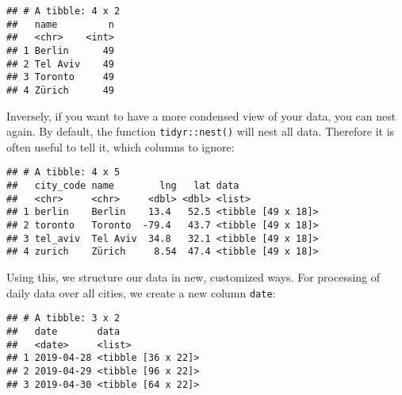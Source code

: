 \documentclass[]{book}
\newenvironment{Shaded}{\begin{snugshade}}{\end{snugshade}}
\newcommand{\DataTypeTok}[1]{\textcolor[rgb]{0.13,0.29,0.53}{#1}}
\newcommand{\KeywordTok}[1]{\textcolor[rgb]{0.13,0.29,0.53}{\textbf{#1}}}
\newcommand{\NormalTok}[1]{#1}
\newcommand{\OperatorTok}[1]{\textcolor[rgb]{0.81,0.36,0.00}{\textbf{#1}}}
\newcommand{\StringTok}[1]{\textcolor[rgb]{0.31,0.60,0.02}{#1}}
\begin{document}
\begin{verbatim}
## # A tibble: 4 x 2
##   name         n
##   <chr>    <int>
## 1 Berlin      49
## 2 Tel Aviv    49
## 3 Toronto     49
## 4 Zürich      49
\end{verbatim}

Inversely, if you want to have a more condensed view of your data, you can nest again.
By default, the function \texttt{tidyr::nest()} will nest all data.
Therefore it is often useful to tell it, which columns to ignore:

\begin{Shaded}
\end{Shaded}

\begin{verbatim}
## # A tibble: 4 x 5
##   city_code name        lng   lat data              
##   <chr>     <chr>     <dbl> <dbl> <list>            
## 1 berlin    Berlin    13.4   52.5 <tibble [49 x 18]>
## 2 toronto   Toronto  -79.4   43.7 <tibble [49 x 18]>
## 3 tel_aviv  Tel Aviv  34.8   32.1 <tibble [49 x 18]>
## 4 zurich    Zürich     8.54  47.4 <tibble [49 x 18]>
\end{verbatim}

Using this, we structure our data in new, customized ways.
For processing of daily data over all cities, we create a new column \texttt{date}:

\begin{Shaded}
\end{Shaded}

\begin{verbatim}
## # A tibble: 3 x 2
##   date       data              
##   <date>     <list>            
## 1 2019-04-28 <tibble [36 x 22]>
## 2 2019-04-29 <tibble [96 x 22]>
## 3 2019-04-30 <tibble [64 x 22]>
\end{verbatim}
\end{document}
